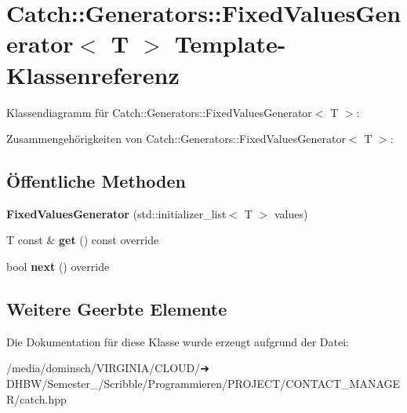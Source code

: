\hypertarget{classCatch_1_1Generators_1_1FixedValuesGenerator}{}\section{Catch\+:\+:Generators\+:\+:Fixed\+Values\+Generator$<$ T $>$ Template-\/\+Klassenreferenz}
\label{classCatch_1_1Generators_1_1FixedValuesGenerator}


Klassendiagramm für Catch\+:\+:Generators\+:\+:Fixed\+Values\+Generator$<$ T $>$\+:


Zusammengehörigkeiten von Catch\+:\+:Generators\+:\+:Fixed\+Values\+Generator$<$ T $>$\+:
\subsection*{Öffentliche Methoden}
\begin{DoxyCompactItemize}
\item 
\mbox{\label{classCatch_1_1Generators_1_1FixedValuesGenerator_a6e9f473655413c1cb15f079890f06b86}} 
{\bfseries Fixed\+Values\+Generator} (std\+::initializer\+\_\+list$<$ T $>$ values)
\item 
\mbox{\label{classCatch_1_1Generators_1_1FixedValuesGenerator_ad2ea8c959c600386bcc4b2656b40d33e}} 
T const  \& {\bfseries get} () const override
\item 
\mbox{\label{classCatch_1_1Generators_1_1FixedValuesGenerator_a6ce9e3ed045239c7b82873f24bd9cd3b}} 
bool {\bfseries next} () override
\end{DoxyCompactItemize}
\subsection*{Weitere Geerbte Elemente}


Die Dokumentation für diese Klasse wurde erzeugt aufgrund der Datei\+:\begin{DoxyCompactItemize}
\item 
/media/dominsch/\+V\+I\+R\+G\+I\+N\+I\+A/\+C\+L\+O\+U\+D/➔ D\+H\+B\+W/\+Semester\+\_/\+Scribble/\+Programmieren/\+P\+R\+O\+J\+E\+C\+T/\+C\+O\+N\+T\+A\+C\+T\+\_\+\+M\+A\+N\+A\+G\+E\+R/catch.\+hpp\end{DoxyCompactItemize}
